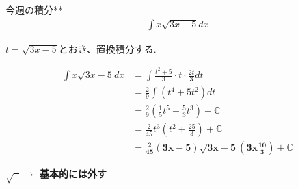 \documentclass[main]{subfiles}
\begin{document}

\begin{mondai}{7}{今週の積分}{**}
    \begin{align*}
        \int x\sqrt{3x-5}dx
    \end{align*}
\end{mondai}


\solutionhead
\hfill
$t=\sqrt{3x-5}$とおき、置換積分する.
\hfill\

\begin{align*}
    \int x\sqrt{3x-5}dx
        &= \int\frac{t^2+5}{3}\cdot t\cdot \frac{2t}{3}dt \\
        &= \frac{2}{9}\int\left(t^4+5t^2\right)dt \\
        &= \frac{2}{9}\left(\frac{1}{5}t^5+\frac{5}{3}t^3\right)+\mathbb{C} \\
        &= \frac{2}{45}t^3\left(t^2+\frac{25}{3}\right)+\mathbb{C} \\
        &= \boldsymbol{\frac{2}{45}\left(3x-5\right)\sqrt{3x-5}\left(3x\frac{10}{3}\right)+\mathbb{C}}
\end{align*}

\begin{focusbox}
\centering
\textbf{$\sqrt{\phantom{x}}\rightarrow$  基本的には外す}
\end{focusbox}
\end{document}
